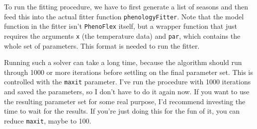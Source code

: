 \documentclass[
]{book}
\newenvironment{Shaded}{\begin{snugshade}}{\end{snugshade}}
\newcommand{\DataTypeTok}[1]{\textcolor[rgb]{0.13,0.29,0.53}{#1}}
\newcommand{\DecValTok}[1]{\textcolor[rgb]{0.00,0.00,0.81}{#1}}
\newcommand{\KeywordTok}[1]{\textcolor[rgb]{0.13,0.29,0.53}{\textbf{#1}}}
\newcommand{\NormalTok}[1]{#1}
\newcommand{\OperatorTok}[1]{\textcolor[rgb]{0.81,0.36,0.00}{\textbf{#1}}}
\newcommand{\OtherTok}[1]{\textcolor[rgb]{0.56,0.35,0.01}{#1}}
\newcommand{\StringTok}[1]{\textcolor[rgb]{0.31,0.60,0.02}{#1}}
\begin{document}
To run the fitting procedure, we have to first generate a list of seasons and then feed this into the actual fitter function \texttt{phenologyFitter}. Note that the model function in the fitter isn't \texttt{PhenoFlex} itself, but a wrapper function that just requires the arguments \texttt{x} (the temperature data) and \texttt{par}, which contains the whole set of parameters. This format is needed to run the fitter.

Running such a solver can take a long time, because the algorithm should run through 1000 or more iterations before settling on the final parameter set. This is controlled with the \texttt{maxit} parameter. I've run the procedure with 1000 iterations and saved the parameters, so I don't have to do it again now. If you want to use the resulting parameter set for some real purpose, I'd recommend investing the time to wait for the results. If you're just doing this for the fun of it, you can reduce \texttt{maxit}, maybe to 100.

\begin{Shaded}
\end{Shaded}
\end{document}
